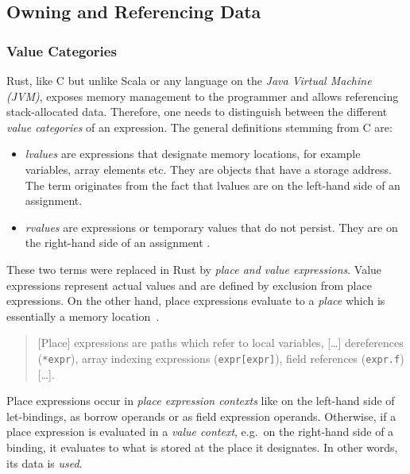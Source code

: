\subsection{Owning and Referencing Data}

\subsubsection{Value Categories}

Rust, like C but unlike Scala or any language on the \emph{Java Virtual Machine
(JVM)}, exposes memory management to the programmer and allows referencing
stack-allocated data. Therefore, one needs to distinguish between the different
\emph{value categories} of an expression. The general definitions stemming from
C are:

\begin{itemize}
\tightlist
\item
  \emph{lvalues} are expressions that designate memory locations, for
  example variables, array elements etc. They are objects that have a
  storage address. The term originates from the fact that lvalues are on
  the left-hand side of an assignment.
\item
  \emph{rvalues} are expressions or temporary values that do not
  persist. They are on the right-hand side of an assignment \cite{wiki:lvalues}.
\end{itemize}

These two terms were replaced in Rust by \emph{place and value expressions}.
Value expressions represent actual values and are defined by exclusion from
place expressions. On the other hand, place expressions evaluate to a
\emph{place} which is essentially a memory location~\cite{rustref}.

\begin{quote}
{[}Place{]} expressions are paths which refer to local variables,
{[}\ldots{]} dereferences (\passthrough{\lstinline!*expr!}), array
indexing expressions (\passthrough{\lstinline!expr[expr]!}), field
references (\passthrough{\lstinline!expr.f!}) {[}\ldots{]}. \\
\cite[section ``Expressions'']{rustref}
\end{quote}

Place expressions occur in \emph{place expression contexts} like on the
left-hand side of let-bindings, as borrow operands or as field expression
operands. Otherwise, if a place expression is evaluated in a \emph{value
context}, e.g.~on the right-hand side of a binding, it evaluates to what is
stored at the place it designates. In other words, its data is \emph{used}.

